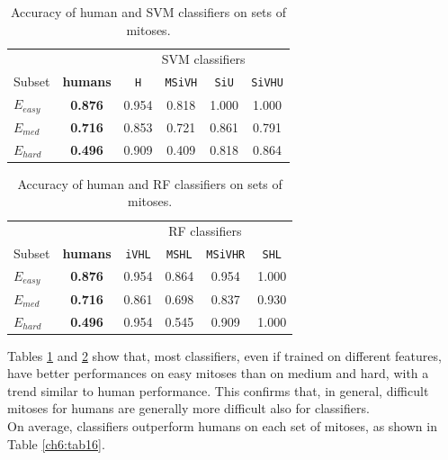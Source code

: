 \begin{table}[!hbt]
\small
 \centering
 \begin{tabular}{lccccc}
  \toprule
                  &            &  \multicolumn{4}{c}{SVM classifiers}    \\
    \cmidrule(lr){3-6}
    Subset        & \textbf{humans}     & \texttt{H} & \texttt{MSiVH} & \texttt{SiU}   & \texttt{SiVHU} \\
    \midrule
    $E_{easy}$   & \textbf{0.876}      & 0.954      & 0.818          & 1.000          & 1.000          \\
     $E_{med}$    & \textbf{0.716}      & 0.853      & 0.721          & 0.861          & 0.791          \\ 
     $E_{hard}$   & \textbf{0.496}      & 0.909      & 0.409          & 0.818          & 0.864          \\
     \bottomrule
 \end{tabular}
 \caption{Accuracy of human and SVM classifiers on sets of mitoses.}
 \label{ch6:tab14}
\end{table}


\begin{table}[!hbt]
\small
 \centering
 \begin{tabular}{lccccc}
  \toprule
                  &            &  \multicolumn{4}{c}{RF classifiers}    \\
    \cmidrule(lr){3-6}
    Subset        & \textbf{humans}     & \texttt{iVHL} & \texttt{MSHL} & \texttt{MSiVHR}   & \texttt{SHL} \\
    \midrule
     $E_{easy}$   & \textbf{0.876}      & 0.954      & 0.864          & 0.954          & 1.000          \\
     $E_{med}$    & \textbf{0.716}      & 0.861      & 0.698          & 0.837          & 0.930          \\ 
     $E_{hard}$   & \textbf{0.496}      & 0.954      & 0.545          & 0.909          & 1.000          \\
     \bottomrule
 \end{tabular}
 \caption{Accuracy of human and RF classifiers on sets of mitoses.}
 \label{ch6:tab15}
\end{table}

Tables \ref{ch6:tab14} and \ref{ch6:tab15} show that, most classifiers, even if trained on different features, have better performances on easy mitoses than on medium and hard,
with a trend similar to human performance. This confirms that, in general, difficult mitoses for humans are generally more difficult also for classifiers.\\
On average, classifiers outperform humans on each set of mitoses, as shown in Table \ref{ch6:tab16}.


